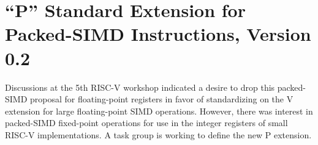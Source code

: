 \chapter{``P'' Standard Extension for Packed-SIMD Instructions,
  Version 0.2}
\label{sec:packedsimd}

\begin{commentary}
  Discussions at the 5th RISC-V workshop indicated a desire to drop
  this packed-SIMD proposal for floating-point registers in favor of
  standardizing on the V extension for large floating-point SIMD
  operations.  However, there was interest in packed-SIMD fixed-point
  operations for use in the integer registers of small RISC-V
  implementations. A task group is working to define the new P
  extension.
\end{commentary}

